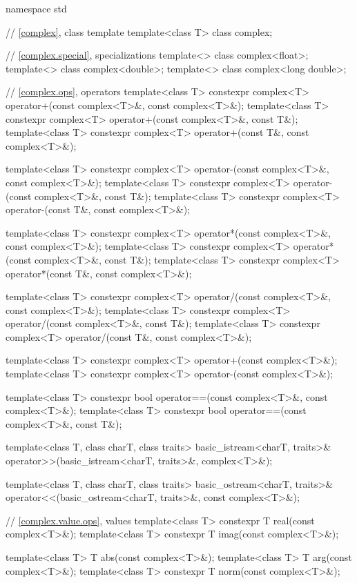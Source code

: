 %
\begin{codeblock}
namespace std {
  // \ref{complex}, class template 
  template<class T> class complex;

  // \ref{complex.special}, specializations
  template<> class complex<float>;
  template<> class complex<double>;
  template<> class complex<long double>;

  // \ref{complex.ops}, operators
  template<class T> constexpr complex<T> operator+(const complex<T>&, const complex<T>&);
  template<class T> constexpr complex<T> operator+(const complex<T>&, const T&);
  template<class T> constexpr complex<T> operator+(const T&, const complex<T>&);

  template<class T> constexpr complex<T> operator-(const complex<T>&, const complex<T>&);
  template<class T> constexpr complex<T> operator-(const complex<T>&, const T&);
  template<class T> constexpr complex<T> operator-(const T&, const complex<T>&);

  template<class T> constexpr complex<T> operator*(const complex<T>&, const complex<T>&);
  template<class T> constexpr complex<T> operator*(const complex<T>&, const T&);
  template<class T> constexpr complex<T> operator*(const T&, const complex<T>&);

  template<class T> constexpr complex<T> operator/(const complex<T>&, const complex<T>&);
  template<class T> constexpr complex<T> operator/(const complex<T>&, const T&);
  template<class T> constexpr complex<T> operator/(const T&, const complex<T>&);

  template<class T> constexpr complex<T> operator+(const complex<T>&);
  template<class T> constexpr complex<T> operator-(const complex<T>&);

  template<class T> constexpr bool operator==(const complex<T>&, const complex<T>&);
  template<class T> constexpr bool operator==(const complex<T>&, const T&);

  template<class T, class charT, class traits>
    basic_istream<charT, traits>& operator>>(basic_istream<charT, traits>&, complex<T>&);

  template<class T, class charT, class traits>
    basic_ostream<charT, traits>& operator<<(basic_ostream<charT, traits>&, const complex<T>&);

  // \ref{complex.value.ops}, values
  template<class T> constexpr T real(const complex<T>&);
  template<class T> constexpr T imag(const complex<T>&);

  template<class T> T abs(const complex<T>&);
  template<class T> T arg(const complex<T>&);
  template<class T> constexpr T norm(const complex<T>&);

}
\end{codeblock}

